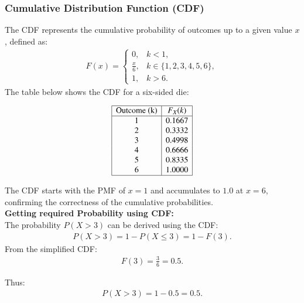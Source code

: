 \documentclass[journal]{IEEEtran}
\begin{document}
\subsubsection*{Cumulative Distribution Function (CDF)}
The CDF represents the cumulative probability of outcomes up to a given value \( x \), defined as:
\begin{align}
F(x) = 
\begin{cases} 
0, & k < 1, \\
\frac{x}{6}, & k \in \{1, 2, 3, 4, 5, 6\}, \\
1, & k > 6.
\end{cases}
\end{align}
The table below shows the CDF for a six-sided die:

\[
\begin{array}{|c|c|}
\hline
\text{Outcome (k)} & F_X(k) \\
\hline
1 & 0.1667 \\
2 & 0.3332 \\
3 & 0.4998 \\
4 & 0.6666 \\
5 & 0.8335 \\
6 & 1.0000 \\
\hline
\end{array}
\]

The CDF starts with the PMF of \(x = 1\) and accumulates to \(1.0\) at \(x = 6\), confirming the correctness of the cumulative probabilities.\\
\textbf{Getting required Probability using CDF:}\\
The probability \( P(X > 3) \) can be derived using the CDF:
\begin{align}
    P(X > 3) = 1 - P(X \leq 3) = 1 - F(3).
\end{align}
From the simplified CDF:
\begin{align}
F(3) = \frac{3}{6} = 0.5.
\end{align}

Thus:
\begin{align}
P(X > 3) = 1 - 0.5 = 0.5.
\end{align}
\end{document}
